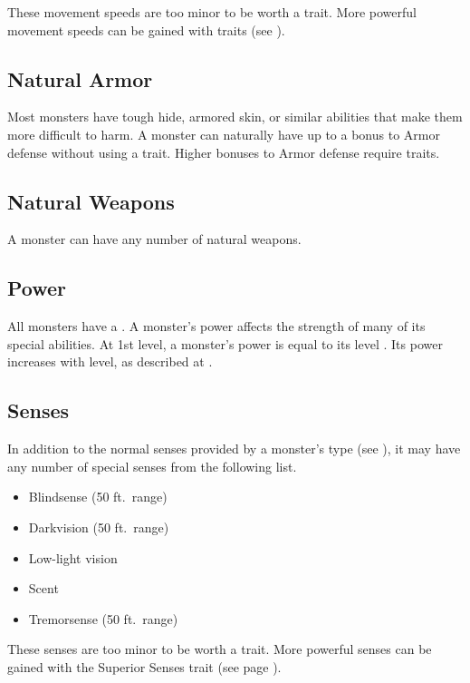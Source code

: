         These movement speeds are too minor to be worth a trait.
        More powerful movement speeds can be gained with traits (see ).

    \subsection{Natural Armor}
        Most monsters have tough hide, armored skin, or similar abilities that make them more difficult to harm.
        A monster can naturally have up to a  bonus to Armor defense without using a trait.
        Higher bonuses to Armor defense require traits.

    \subsection{Natural Weapons}
        A monster can have any number of natural weapons.

    \subsection{Power}\label{Power}
        All monsters have a .
        A monster's power affects the strength of many of its special abilities.
        At 1st level, a monster's power is equal to its level .
        Its power increases with level, as described at .

    \subsection{Senses}
        In addition to the normal senses provided by a monster's type (see ), it may have any number of special senses from the following list.
        \begin{itemize}
            \item Blindsense (50 ft.\ range)
            \item Darkvision (50 ft.\ range)
            \item Low-light vision
            \item Scent
            \item Tremorsense (50 ft.\ range)
        \end{itemize}

        These senses are too minor to be worth a trait.
        More powerful senses can be gained with the Superior Senses trait (see page ).

